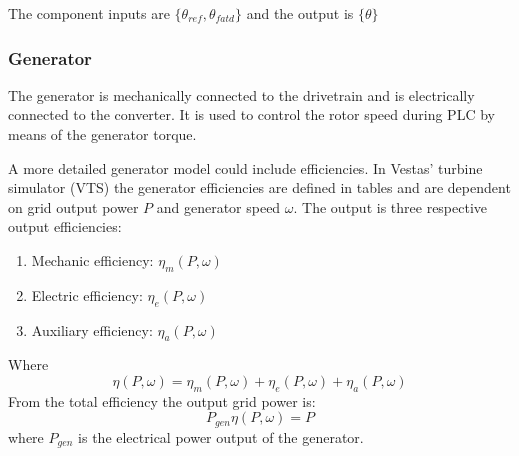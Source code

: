 
The component inputs are $ \{\theta_{ref}, \theta_{fatd}  \} $ and the output is $ \{\theta \} $


\subsubsection{Generator} \label{sec:comp_generator_eff}
The generator is mechanically connected to the drivetrain and is electrically connected to the converter. It is used to control the rotor speed during PLC by means of the generator torque.

A more detailed generator model could include efficiencies. In Vestas' turbine simulator (VTS) the generator efficiencies are defined in tables and are dependent on grid output power $ P $ and generator speed $ \omega $. The output is three respective output efficiencies: 
\begin{enumerate}
	\item Mechanic efficiency: $ \eta_m(P,\omega) $
	\item Electric efficiency: $ \eta_e(P,\omega) $
	\item Auxiliary efficiency: $ \eta_a(P,\omega) $
\end{enumerate}
Where 
\begin{equation}\label{eq:comp_gen_effi_eff}
	\eta(P,\omega) = \eta_m(P,\omega) + \eta_e(P,\omega) + \eta_a(P,\omega)
\end{equation}
From the total efficiency the output grid power is:
\begin{equation}\label{eq:comp_gen_elec_pow_eff}
	P_{gen} \eta(P,\omega) = P
\end{equation}
where $ P_{gen} $ is the electrical power output of the generator.

